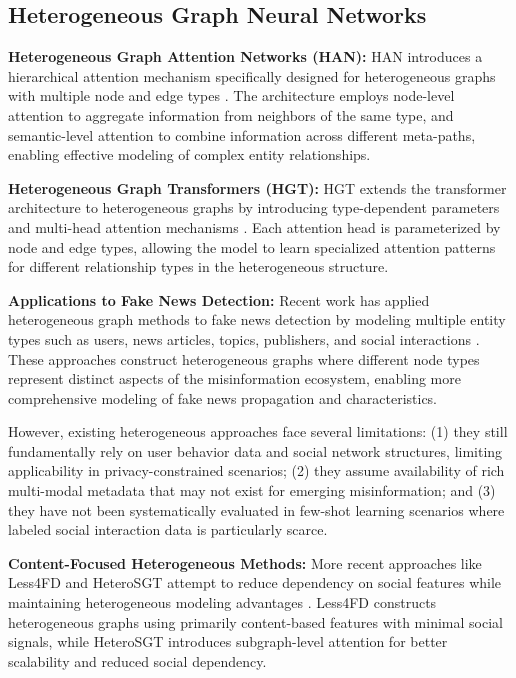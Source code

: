 \subsection{Heterogeneous Graph Neural Networks}

\textbf{Heterogeneous Graph Attention Networks (HAN):} HAN introduces a hierarchical attention mechanism specifically designed for heterogeneous graphs with multiple node and edge types \cite{wang2019han}. The architecture employs node-level attention to aggregate information from neighbors of the same type, and semantic-level attention to combine information across different meta-paths, enabling effective modeling of complex entity relationships.


\textbf{Heterogeneous Graph Transformers (HGT):} HGT extends the transformer architecture to heterogeneous graphs by introducing type-dependent parameters and multi-head attention mechanisms \cite{hu2020heterogeneous}. Each attention head is parameterized by node and edge types, allowing the model to learn specialized attention patterns for different relationship types in the heterogeneous structure.

\textbf{Applications to Fake News Detection:} Recent work has applied heterogeneous graph methods to fake news detection by modeling multiple entity types such as users, news articles, topics, publishers, and social interactions \cite{dou2021user, lu2020gcan, silva2021embracing}. These approaches construct heterogeneous graphs where different node types represent distinct aspects of the misinformation ecosystem, enabling more comprehensive modeling of fake news propagation and characteristics.


However, existing heterogeneous approaches face several limitations: (1) they still fundamentally rely on user behavior data and social network structures, limiting applicability in privacy-constrained scenarios; (2) they assume availability of rich multi-modal metadata that may not exist for emerging misinformation; and (3) they have not been systematically evaluated in few-shot learning scenarios where labeled social interaction data is particularly scarce.

\textbf{Content-Focused Heterogeneous Methods:} More recent approaches like Less4FD and HeteroSGT attempt to reduce dependency on social features while maintaining heterogeneous modeling advantages \cite{zhang2023less4fd, wang2023heterosgt}. Less4FD constructs heterogeneous graphs using primarily content-based features with minimal social signals, while HeteroSGT introduces subgraph-level attention for better scalability and reduced social dependency.

